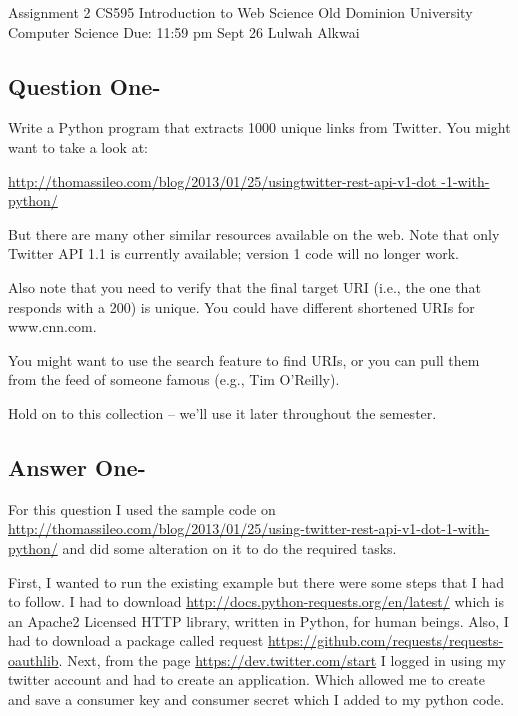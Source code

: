 \documentclass[letterpaper,11pt]{article}
\begin{document}
\begin{titlepage}
\begin{center}


\Huge{Assignment 2}
\newline
\Large{CS595}
\newline
\Large{Introduction to Web Science}
\newline
\Large{Old Dominion University}
\newline
\Large{Computer Science}
\newline
\Large{Due: 11:59 pm Sept 26}
\newline
\Large{Lulwah Alkwai}
\newline
\end{center}
\end{titlepage}
\newpage


\subsection*{Question One-}

Write a Python program that extracts 1000 unique links from Twitter.
You might want to take a look at:

\url{http://thomassileo.com/blog/2013/01/25/usingtwitter-rest-api-v1-dot
-1-with-python/}

But there are many other similar resources available on the web.
Note that only Twitter API 1.1 is currently available; version 1
code will no longer work.

Also note that you need to verify that the final target URI
(i.e., the one that responds with a 200) is unique.
You could have different shortened URIs for www.cnn.com.

You might want to use the search feature to find URIs, or you can
pull them from the feed of someone famous (e.g., Tim O'Reilly).

Hold on to this collection -- 
we'll use it later throughout the semester.



\subsection*{Answer One-}
For this question I used the sample code on \url{http://thomassileo.com/blog/2013/01/25/using-twitter-rest-api-v1-dot-1-with-python/} and did some alteration on it to do the required tasks.

First, I wanted to run the existing example but there were some steps that I had to follow.
I had to download \url{http://docs.python-requests.org/en/latest/} which is  an Apache2 Licensed HTTP library, written in Python, for human beings. Also, I had to download a package called request \url{https://github.com/requests/requests-oauthlib}.
Next, from the page \url{https://dev.twitter.com/start} I logged in using my twitter account and had to create an application. Which allowed me to create and save a consumer key and consumer secret which I added to my python code. 
\end{document}
